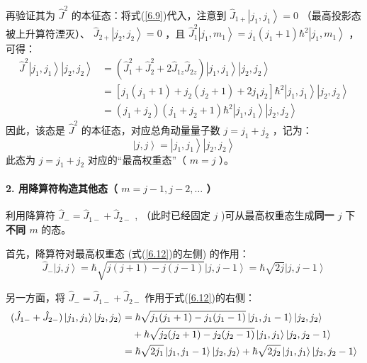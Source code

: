再验证其为 \(\hat{J}^2\) 的本征态：将式(\ref{6.9})代入，注意到 \(\hat{J}_{1+} \left| j_1, j_1 \right> = 0\) （最高投影态被上升算符湮灭）、 \(\hat{J}_{2+} \left| j_2, j_2 \right> = 0\) ，且 \(\hat{J}_1^2 \left| j_1, m_1 \right> = j_1(j_1+1)\hbar^2 \left| j_1, m_1 \right>\) ，可得：
\begin{align}
	\hat{J}^2 \left| j_1, j_1 \right>\left| j_2, j_2 \right> &= \left( \hat{J}_1^2 + \hat{J}_2^2 + 2\hat{J}_{1z}\hat{J}_{2z} \right) \left| j_1, j_1 \right>\left| j_2, j_2 \right> \\
	&= \left[ j_1(j_1+1) + j_2(j_2+1) + 2j_1j_2 \right] \hbar^2 \left| j_1, j_1 \right>\left| j_2, j_2 \right> \\
	&= (j_1+j_2)(j_1+j_2+1)\hbar^2 \left| j_1, j_1 \right>\left| j_2, j_2 \right>
\end{align}
因此，该态是 \(\hat{J}^2\) 的本征态，对应总角动量量子数 \(j = j_1 + j_2\) ，记为：
\begin{equation}
	\left| j, j \right> = \left| j_1, j_1 \right>\left| j_2, j_2 \right> \label{6.12}
\end{equation}
此态为 \(j = j_1 + j_2\) 对应的“最高权重态”（ \(m = j\) ）。


\paragraph{2. 用降算符构造其他态（ \(m = j-1, j-2, \dots\) ）}

利用降算符 \(\hat{J}_- = \hat{J}_{1-} + \hat{J}_{2-}\) , （此时已经固定  \(j\)  )可从最高权重态生成\textbf{同一  \(j\)  }下\textbf{不同  \(m\) } 的态。

首先，降算符对最高权重态 (式(\ref{6.12})的左侧) 的作用：
\begin{equation}
	\hat{J}_- \left| j, j \right> = \hbar\sqrt{j(j+1) - j(j-1)} \left| j, j-1 \right> = \hbar\sqrt{2j} \left| j, j-1 \right> \label{6.13}
\end{equation}

另一方面，将 \(\hat{J}_- = \hat{J}_{1-} + \hat{J}_{2-}\) 作用于式(\ref{6.12})的右侧：
\begin{align}
	(\hat{J}_{1-} + \hat{J}_{2-}) \ket{j_1, j_1} \ket{j_2, j_2} 
	&= \hbar\sqrt{j_1(j_1+1) - j_1(j_1-1)} \ket{j_1, j_1-1} \ket{j_2, j_2} \nonumber \\
	&\quad + \hbar\sqrt{j_2(j_2+1) - j_2(j_2-1)} \ket{j_1, j_1} \ket{j_2, j_2-1}  \nonumber\\
	&= \hbar\sqrt{2j_1} \ket{j_1, j_1-1} \ket{j_2, j_2} + \hbar\sqrt{2j_2} \ket{j_1, j_1} \ket{j_2, j_2-1}\label{6.14}
\end{align}

